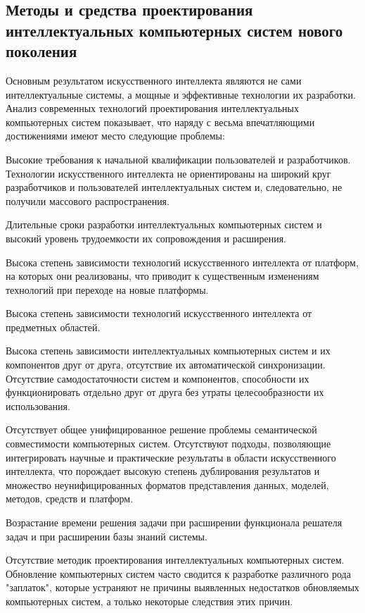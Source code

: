 \begin{partbacktext}
\part{Методы и средства проектирования интеллектуальных компьютерных систем нового поколения}
\noindent
Основным результатом искусственного интеллекта являются не сами интеллектуальные системы, а мощные и эффективные технологии их разработки. Анализ современных технологий проектирования интеллектуальных компьютерных систем показывает, что наряду с весьма впечатляющими достижениями имеют место следующие проблемы:
\begin{textitemize}
	\item Высокие требования к начальной квалификации пользователей и разработчиков. Технологии искусственного интеллекта не ориентированы на широкий круг разработчиков и пользователей интеллектуальных систем и, следовательно, не получили массового распространения.
	\item Длительные сроки разработки интеллектуальных компьютерных систем и высокий уровень трудоемкости их сопровождения и расширения.
	\item Высока степень зависимости технологий искусственного интеллекта от платформ, на которых они реализованы, что приводит к существенным изменениям технологий при переходе на новые платформы.
	\item Высока степень зависимости технологий искусственного интеллекта от предметных областей.
	\item Высока степень зависимости интеллектуальных компьютерных систем и их компонентов друг от друга, отсутствие их автоматической синхронизации. Отсутствие самодостаточности систем и компонентов, способности их функционировать отдельно друг от друга без утраты целесообразности их использования.
	\item Отсутствует общее унифицированное решение проблемы семантической совместимости компьютерных систем. Отсутствуют подходы, позволяющие интегрировать научные и практические результаты в области искусственного интеллекта, что порождает высокую степень дублирования результатов и множество неунифицированных форматов представления данных, моделей, методов, средств и платформ.
	\item Возрастание времени решения задачи при расширении функционала решателя задач и при расширении базы знаний системы.
	\item Отсутствие методик проектирования интеллектуальных компьютерных систем. Обновление компьютерных систем часто сводится к разработке	различного рода "заплаток"{}, которые устраняют не причины выявленных недостатков обновляемых компьютерных систем, а только некоторые следствия этих причин.

\end{textitemize}
\end{partbacktext}
